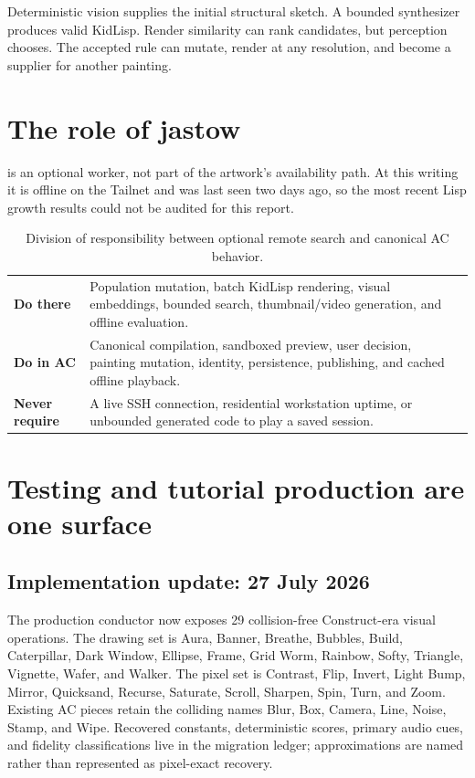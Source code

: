 \documentclass[10pt,letterpaper,twocolumn]{article}
\newcommand{\mono}[1]{\code{#1}}
\begin{document}
Deterministic vision supplies the initial structural sketch. A bounded synthesizer produces valid KidLisp. Render similarity can rank candidates, but perception chooses. The accepted rule can mutate, render at any resolution, and become a supplier for another painting.

\section{The role of jastow}

\mono{jastow} is an optional worker, not part of the artwork's availability path. At this writing it is offline on the Tailnet and was last seen two days ago, so the most recent Lisp growth results could not be audited for this report.

\begin{table}[h]
\caption{Division of responsibility between optional remote search and canonical AC behavior.}
\small
\begin{tabularx}{\linewidth}{@{}L{0.72in}Y@{}}
\toprule
\textbf{Do there} & Population mutation, batch KidLisp rendering, visual embeddings, bounded search, thumbnail/video generation, and offline evaluation. \\
\textbf{Do in AC} & Canonical compilation, sandboxed preview, user decision, painting mutation, identity, persistence, publishing, and cached offline playback. \\
\textbf{Never require} & A live SSH connection, residential workstation uptime, or unbounded generated code to play a saved session. \\
\bottomrule
\end{tabularx}
\end{table}

\section{Testing and tutorial production are one surface}

\subsection{Implementation update: 27 July 2026}

The production conductor now exposes 29 collision-free Construct-era visual operations. The drawing set is Aura, Banner, Breathe, Bubbles, Build, Caterpillar, Dark Window, Ellipse, Frame, Grid Worm, Rainbow, Softy, Triangle, Vignette, Wafer, and Walker. The pixel set is Contrast, Flip, Invert, Light Bump, Mirror, Quicksand, Recurse, Saturate, Scroll, Sharpen, Spin, Turn, and Zoom. Existing AC pieces retain the colliding names Blur, Box, Camera, Line, Noise, Stamp, and Wipe. Recovered constants, deterministic scores, primary audio cues, and fidelity classifications live in the migration ledger; approximations are named rather than represented as pixel-exact recovery.
\end{document}
